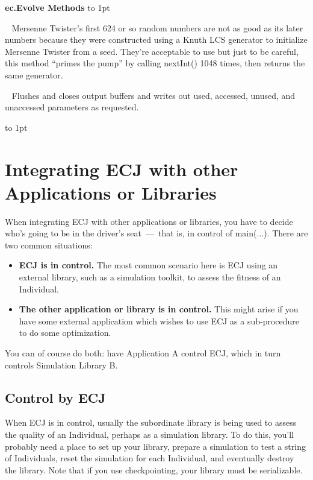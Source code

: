 \documentclass[twoside,10pt]{book}
\newcommand\method[1]{\index{#1}\textsf{#1}}
\newcommand*{\xfill}[1][0pt]{%
	\cleaders
		\hbox to 1pt{\hss
			\raisebox{#1}{\rule{1.2pt}{0.4pt}}%
			\hss}\hfill}
\newenvironment{methods}[1]{
\vspace{1.0em}\noindent\textsf{\textbf{#1 Methods}}\quad \xfill[0.5ex]
\vspace{-0.25em}
\begin{description}
\small}
{\end{description}\vspace{-0.5em}\rule{0pt}{0pt}\xfill[0ex]\vspace{1em}}
\newcommand{\mthd}[1]{\item[{\sf #1}]~\newline}
\begin{document}
\begin{methods}{ec.Evolve}
\mthd{public static MersenneTwisterFast primeGenerator(MersenneTwisterFast \textit{generator})}
Mersenne Twister's first 624 or so random numbers are not as good as its later numbers because they were constructed using a Knuth LCS generator to initialize Mersenne Twister from a seed.  They're acceptable to use but just to be careful, this method ``primes the pump'' by calling \method{nextInt()} 1048 times, then returns the same generator.
\mthd{public static void cleanup(EvolutionState {\it state})}
Flushes and closes output buffers and writes out used, accessed, unused, and unaccessed parameters as requested.
\end{methods}


\section{Integrating ECJ with other Applications or Libraries}
\label{integration}

When integrating ECJ with other applications or libraries, you have to decide who's going to be in the driver's seat \,---\, that is, in control of \method{main(...)}.  There are two common situations:

\begin{itemize}
\item {\bf ECJ is in control.}  The most common scenario here is ECJ using an external library, such as a simulation toolkit, to assess the fitness of an Individual.
\item {\bf The other application or library is in control.}  This might arise if you have some external application which wishes to use ECJ as a sub-procedure to do some optimization.
\end{itemize}

You can of course do both: have Application A control ECJ, which in turn controls Simulation Library B.

\subsection{Control by ECJ}

When ECJ is in control, usually the subordinate library is being used to assess the quality of an Individual, perhaps as a simulation library.  To do this, you'll probably need a place to set up your library, prepare a simulation to test a string of Individuals, reset the simulation for each Individual, and eventually destroy the library.  Note that if you use checkpointing, your library must be serializable.   
\end{document}
